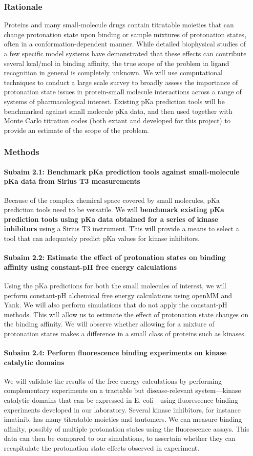 \documentclass[10pt]{article}
\newcommand{\subsubsubsection}[1]{\paragraph*{#1}}
\begin{document}
\subsubsection*{Rationale}
Proteins and many small-molecule drugs contain titratable moieties that can change protonation state upon binding or sample mixtures of protonation states, often in a conformation-dependent manner.
While detailed biophysical studies of a few specific model systems have demonstrated that these effects can contribute several kcal/mol in binding affinity, the true scope of the problem in ligand recognition in general is completely unknown.
We will use computational techniques to conduct a large scale survey to broadly assess the importance of protonation state issues in protein-small molecule interactions across a range of systems of pharmacological interest.
Existing pKa prediction tools will be benchmarked against small molecule pKa data, and then used together with Monte Carlo titration codes (both extant and developed for this project) to provide an estimate of the scope of the problem.

\subsubsection*{Methods}
\subsubsubsection{Subaim 2.1: Benchmark pKa prediction tools against small-molecule pKa data from Sirius T3 measurements}
Because of the complex chemical space covered by small molecules, pKa prediction tools need to be versatile. We will \textbf{benchmark existing pKa prediction tools using pKa data obtained for a series of kinase inhibitors} using a Sirius T3 instrument. This will provide a means to select a tool that can adequately predict pKa values for kinase inhibitors.


\subsubsubsection{Subaim 2.2: Estimate the effect of protonation states on binding affinity using constant-pH free energy calculations}
Using the pKa predictions for both the small molecules of interest, we will perform constant-pH alchemical free energy calculations\cite{Mongan2004a} using openMM\cite{Eastman2013a} and Yank. We will also perform simulations that do not apply the constant-pH methods. This will allow us to estimate the effect of protonation state changes on the binding affinity. We will observe whether allowing for a mixture of protonation states makes a difference in a small class of proteins such as kinases.

\subsubsubsection{Subaim 2.4: Perform fluorescence binding experiments on kinase catalytic domains}
We will validate the results of the free energy calculations by performing complementary experiments on a tractable but disease-relevant system---kinase catalytic domains that can be expressed in E. coli---using fluorescence binding experiments developed in our laboratory. Several kinase inhibitors, for instance imatinib, has many titratable moieties and tautomers. We can measure binding affinity, possibly of multiple protonation states using the fluorescence assays. This data can then be compared to our simulations, to assertain whether they can recapitulate the protonation state effects observed in experiment.
\end{document}

